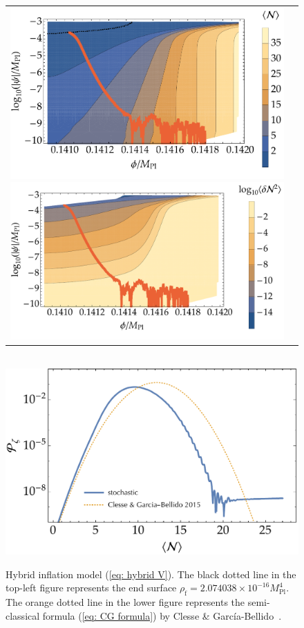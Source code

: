 \documentclass[aps, prd
, preprint
, nofootinbib 
, longbibliography
]{revtex4-1}
\newcommand{\Mpl}{M_\text{Pl}}
\newcommand{\uf}{\text{f}}
\begin{document}
\begin{figure}
	\centering
	\begin{tabular}{cc}
		\begin{minipage}{0.5\hsize}
			\centering
			\includegraphics[width=0.9\hsize]{figs/hybrid/N_conf.pdf}
		\end{minipage}
		\begin{minipage}{0.5\hsize}
			\centering
			\includegraphics[width=0.9\hsize]{figs/hybrid/dN2_conf.pdf}
		\end{minipage}
	\end{tabular} \\[10pt]
	\includegraphics[width=0.5\hsize]{figs/hybrid/Pzeta_conf.pdf}
	\caption{Hybrid inflation model (\ref{eq: hybrid V}). The black dotted line in the top-left figure represents the end surface $\rho_\uf=2.074038\times10^{-16}\Mpl^4$.
	The orange dotted line in the lower figure represents the semi-classical formula (\ref{eq: CG formula}) by Clesse \& Garc\'ia-Bellido~\cite{Clesse:2015wea}.}
	\label{figs: hybrid_conf}
\end{figure}
\end{document}
